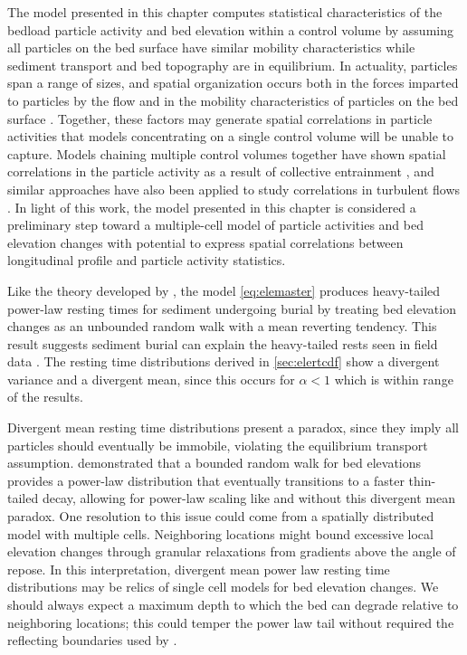 The model presented in this chapter computes statistical characteristics of the bedload particle activity and bed elevation within a control volume by assuming all particles on the bed surface have similar mobility characteristics while sediment transport and bed topography are in equilibrium. In actuality, particles span a range of sizes, and spatial organization occurs both in the forces imparted to particles by the flow \citep{Shih2017,Amir2014} and in the mobility characteristics of particles on the bed surface \citep{Charru2004, Hassan2008, Nelson2014}.
Together, these factors may generate spatial correlations in particle activities that models concentrating on a single control volume will be unable to capture. 
Models chaining multiple control volumes together have shown spatial correlations in the particle activity as a result of collective entrainment \citep{Heyman2014, Ancey2015}, and similar approaches have also been applied to study correlations in turbulent flows \citep{Gardiner1983}. In light of this work, the model presented in this chapter is considered a preliminary step toward a multiple-cell model of particle activities and bed elevation changes with potential to express spatial correlations between longitudinal profile and particle activity statistics.

Like the theory developed by \citet{Martin2014}, the model \ref{eq:elemaster} produces heavy-tailed power-law resting times for sediment undergoing burial by treating bed elevation changes as an unbounded random walk with a mean reverting tendency.
This result suggests sediment burial can explain the heavy-tailed rests seen in field data \citep{Olinde2015,Bradley2017,Pretzlav2016a}. 
The resting time distributions derived in \DIFdelbegin {}\DIFdelend \DIFaddbegin {}\DIFaddend \ref{sec:elertcdf} show a divergent variance and \DIFdelbegin {}\DIFdelend \DIFaddbegin {}\DIFaddend a divergent mean, since this occurs for $\alpha < 1$ \citep{Sornette2006} which is within range of the results.

Divergent mean resting time distributions present a paradox, since they imply all particles should eventually be immobile, violating the equilibrium transport assumption.
\citet{Voepel2013} demonstrated that a bounded random walk for bed elevations provides a power-law distribution that eventually transitions to a faster thin-tailed decay, allowing for power-law scaling like \DIFdelbegin {}\DIFdelend \DIFaddbegin {}\DIFaddend and \citet{Martin2014} without this divergent mean paradox. 
One resolution to this issue could come from a spatially distributed model with multiple cells.
Neighboring locations might bound excessive local elevation changes through granular relaxations from gradients above the angle of repose.
In this interpretation, divergent mean power law resting time distributions may be relics of single cell models for bed elevation changes.
We should always expect a maximum depth to which the bed can degrade relative to neighboring locations; this could temper the power law tail without required the reflecting boundaries used by \citet{Voepel2013}.

